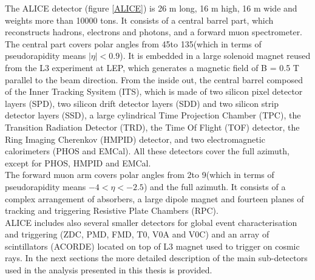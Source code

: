 \documentclass[b5paper,10pt,twoside,oldstyle,classica]{toptesi}
\begin{document}
The ALICE detector (figure \ref{ALICE}) is 26 m long, 16 m high, 16 m wide and weights more than 10000 tons. It consists of a central barrel part, which reconstructs hadrons, electrons and photons, and a forward muon spectrometer. The central part covers polar angles from 45\textdegree \space to 135\textdegree \space (which in terms of pseudorapidity means $|\eta| < 0.9$). It is embedded in a large solenoid magnet reused from the L3 experiment at LEP, which generates a magnetic field of B = 0.5 T parallel to the beam direction. From the inside out, the central barrel composed of the Inner Tracking Sysitem (ITS), which is made of two silicon pixel detector layers (SPD), two silicon drift detector layers (SDD) and two silicon strip detector layers (SSD), a large cylindrical Time Projection Chamber (TPC), the Transition Radiation Detector (TRD), the Time Of Flight (TOF) detector, the Ring Imaging Cherenkov (HMPID) detector, and two electromagnetic calorimeters (PHOS and EMCal). All these detectors cover the full azimuth, except for PHOS, HMPID and EMCal.\\
The forward muon arm covers polar angles from 2\textdegree \space to 9\textdegree \space(which in terms of pseudorapidity means $-4 < \eta < -2.5$) and the full azimuth. It consists of a complex arrangement of absorbers, a large dipole magnet and fourteen planes of tracking and triggering Resistive Plate Chambers (RPC).\\
ALICE includes also several smaller detectors for global event characterisation and triggering (ZDC, PMD, FMD, T0, V0A and V0C) and an array of scintillators (ACORDE) located on top of L3 magnet used to trigger on cosmic rays.
In the next sections the more detailed description of the main sub-detectors used in the analysis presented in this thesis is provided.
\end{document}
